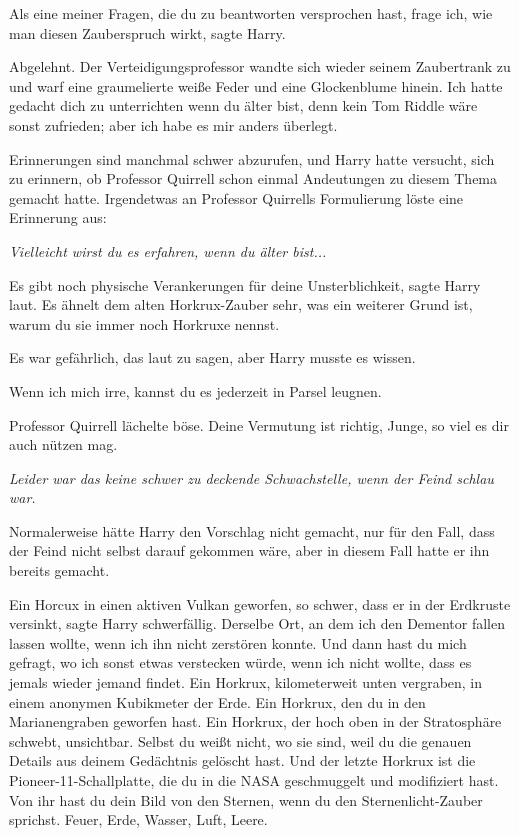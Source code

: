 \glqq{}Als eine meiner Fragen, die du zu beantworten versprochen hast, frage ich,
wie man diesen Zauberspruch wirkt\grqq{}, sagte Harry.

\glqq{}Abgelehnt.\grqq{} Der Verteidigungsprofessor wandte sich wieder seinem
Zaubertrank zu und warf eine graumelierte weiße Feder und eine Glockenblume
hinein. \glqq{}Ich hatte gedacht dich zu unterrichten wenn du älter bist, denn
kein Tom Riddle wäre sonst zufrieden; aber ich habe es mir anders
überlegt.\grqq{}

Erinnerungen sind manchmal schwer abzurufen, und Harry hatte versucht, sich zu
erinnern, ob Professor Quirrell schon einmal Andeutungen zu diesem Thema gemacht
hatte. Irgendetwas an Professor Quirrells Formulierung löste eine Erinnerung
aus:

\emph{Vielleicht wirst du es erfahren, wenn du älter bist...}

\glqq{}Es gibt noch physische Verankerungen für deine Unsterblichkeit\grqq{},
sagte Harry laut. \glqq{}Es ähnelt dem alten Horkrux-Zauber sehr, was ein
weiterer Grund ist, warum du sie immer noch Horkruxe nennst.\grqq{}

Es war gefährlich, das laut zu sagen, aber Harry musste es wissen.

\glqq{}Wenn ich mich irre, kannst du es jederzeit in Parsel leugnen.\grqq{}

Professor Quirrell lächelte böse. \glqq{}Deine Vermutung ist richtig, Junge, so
viel es dir auch nützen mag.\grqq{}

\emph{Leider war das keine schwer zu deckende Schwachstelle, wenn der Feind
schlau war.}

Normalerweise hätte Harry den Vorschlag nicht gemacht, nur für den Fall, dass
der Feind nicht selbst darauf gekommen wäre, aber in diesem Fall hatte er ihn
bereits gemacht.

\glqq{}Ein Horcux in einen aktiven Vulkan geworfen, so schwer, dass er in der
Erdkruste versinkt\grqq{}, sagte Harry schwerfällig. \glqq{}Derselbe Ort, an dem
ich den Dementor fallen lassen wollte, wenn ich ihn nicht zerstören konnte. Und
dann hast du mich gefragt, wo ich sonst etwas verstecken würde, wenn ich nicht
wollte, dass es jemals wieder jemand findet. Ein Horkrux, kilometerweit unten
vergraben, in einem anonymen Kubikmeter der Erde. Ein Horkrux, den du in den
Marianengraben geworfen hast. Ein Horkrux, der hoch oben in der Stratosphäre
schwebt, unsichtbar. Selbst du weißt nicht, wo sie sind, weil du die genauen
Details aus deinem Gedächtnis gelöscht hast. Und der letzte Horkrux ist die
Pioneer-11-Schallplatte, die du in die NASA geschmuggelt und modifiziert hast.
Von ihr hast du dein Bild von den Sternen, wenn du den Sternenlicht-Zauber
sprichst. Feuer, Erde, Wasser, Luft, Leere.\grqq{}

